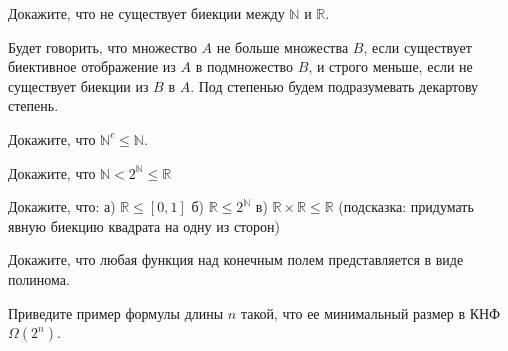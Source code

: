 \setcounter{curtask}{1}


\begin{task}
    Докажите, что не существует биекции между $\mathbb{N}$ и $\mathbb{R}$.
\end{task}

Будет говорить, что множество $A$ не больше множества $B$, если
существует биективное отображение из $A$ в подмножество $B$, и строго
меньше, если не существует биекции из $B$ в $A$. Под степенью будем
подразумевать декартову степень.

\begin{task}
    Докажите, что $\mathbb{N}^c \le \mathbb{N}$.
\end{task}

\begin{task}
    Докажите, что $\mathbb{N} < 2^{\mathbb{N}} \le \mathbb{R}$
\end{task}

\begin{task}
    Докажите, что:
    а) $\mathbb{R} \le [0, 1]$
    б) $\mathbb{R} \le 2^{\mathbb{N}}$
    в) $\mathbb{R} \times \mathbb{R} \le \mathbb{R}$ (подсказка:
	    придумать явную биекцию квадрата на одну из сторон)
\end{task}

\begin{task}
    Докажите, что любая функция над конечным полем представляется в
	виде полинома.
\end{task}

\begin{task}
    Приведите пример формулы длины $n$ такой, что ее минимальный
    размер в КНФ $\Omega(2^n)$.
\end{task}
